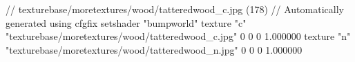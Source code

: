 // texturebase/moretextures/wood/tatteredwood_c.jpg (178)
// Automatically generated using cfgfix
setshader "bumpworld"
texture "c" "texturebase/moretextures/wood/tatteredwood_c.jpg" 0 0 0 1.000000
texture "n" "texturebase/moretextures/wood/tatteredwood_n.jpg" 0 0 0 1.000000
